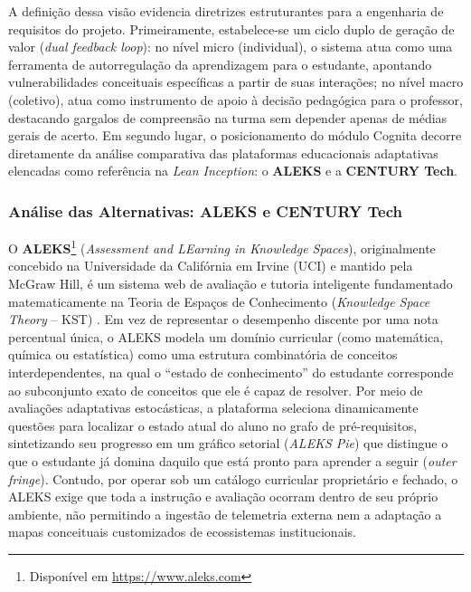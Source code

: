 A definição dessa visão evidencia diretrizes estruturantes para a engenharia de requisitos do projeto. Primeiramente, estabelece-se um ciclo duplo de geração de valor (\textit{dual feedback loop}): no nível micro (individual), o sistema atua como uma ferramenta de autorregulação da aprendizagem para o estudante, apontando vulnerabilidades conceituais específicas a partir de suas interações; no nível macro (coletivo), atua como instrumento de apoio à decisão pedagógica para o professor, destacando gargalos de compreensão na turma sem depender apenas de médias gerais de acerto. Em segundo lugar, o posicionamento do módulo Cognita decorre diretamente da análise comparativa das plataformas educacionais adaptativas elencadas como referência na \textit{Lean Inception}: o \textbf{ALEKS} e a \textbf{CENTURY Tech}.

\subsubsection{Análise das Alternativas: ALEKS e CENTURY Tech}
\label{subsubsec:analise-alternativas}

O \textbf{ALEKS}\footnote{Disponível em \url{https://www.aleks.com}} (\textit{Assessment and LEarning in Knowledge Spaces}), originalmente concebido na Universidade da Califórnia em Irvine (UCI) e mantido pela McGraw Hill, é um sistema web de avaliação e tutoria inteligente fundamentado matematicamente na Teoria de Espaços de Conhecimento (\textit{Knowledge Space Theory} -- KST) \cite{falmagne_learning_2011}. Em vez de representar o desempenho discente por uma nota percentual única, o ALEKS modela um domínio curricular (como matemática, química ou estatística) como uma estrutura combinatória de conceitos interdependentes, na qual o ``estado de conhecimento'' do estudante corresponde ao subconjunto exato de conceitos que ele é capaz de resolver. Por meio de avaliações adaptativas estocásticas, a plataforma seleciona dinamicamente questões para localizar o estado atual do aluno no grafo de pré-requisitos, sintetizando seu progresso em um gráfico setorial (\textit{ALEKS Pie}) que distingue o que o estudante já domina daquilo que está pronto para aprender a seguir (\textit{outer fringe}). Contudo, por operar sob um catálogo curricular proprietário e fechado, o ALEKS exige que toda a instrução e avaliação ocorram dentro de seu próprio ambiente, não permitindo a ingestão de telemetria externa nem a adaptação a mapas conceituais customizados de ecossistemas institucionais.

